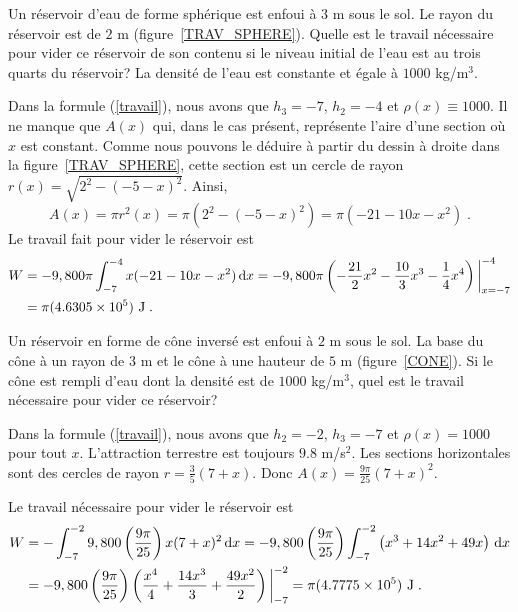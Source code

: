 {

\begin{egg}
Un réservoir d'eau de forme sphérique est enfoui à $3$ m sous le sol.
Le rayon du réservoir est de $2$ m (figure~\ref{TRAV_SPHERE}).  Quelle est le 
travail nécessaire pour vider ce réservoir de son contenu si le niveau
initial de l'eau est au trois quarts du réservoir?  La densité de
l'eau est constante et égale à $1000$ kg/m$^3$.

Dans la formule (\ref{travail}), nous avons que $h_3=-7$, $h_2=-4$ et
$\rho(x) \equiv 1000$.  Il ne manque que $A(x)$ qui, dans le cas présent,
représente l'aire d'une section où $x$ est constant.  Comme nous
pouvons le déduire à partir du dessin à droite dans la
figure~\ref{TRAV_SPHERE}, cette section est un cercle de rayon
$r(x) = \sqrt{2^2 - (-5-x)^2}$.  Ainsi,
\[
A(x) = \pi r^2(x) = \pi (2^2 - (-5-x)^2) = \pi(-21-10x-x^2) \; .
\]
Le travail fait pour vider le réservoir est
\begin{align*}
W &= -9,800\pi \int_{-7}^{-4} x(-21-10x-x^2) \,\mathrm{d}x
= -9,800\pi \left( -\frac{21}{2}x^2 -\frac{10}{3}x^3
  -\frac{1}{4}x^4\right)\bigg|_{x=-7}^{-4}\\
&= \pi( 4.6305 \times 10^5) \ \text{J} \; .
\end{align*}
\end{egg}

\begin{egg}
Un réservoir en forme de cône inversé est enfoui à $2$ m sous le
sol. La base du cône à un rayon de $3$ m et le cône à une hauteur de
$5$ m (figure~\ref{CONE}).  Si le cône est rempli d'eau dont la densité est
de $1000$ kg/m$^3$, quel est le travail nécessaire pour vider ce réservoir?

Dans la formule (\ref{travail}), nous avons que
$h_2=-2$, $h_3=-7$ et $\rho(x) = 1000$ pour tout $x$.  L'attraction
terrestre est toujours $9.8$ m/s$^2$.  Les sections horizontales sont
des cercles de rayon $\displaystyle r= \frac{3}{5} (7+x)$.  Donc
$\displaystyle A(x) = \frac{9\pi}{25} (7+x)^2$.

Le travail nécessaire pour vider le réservoir est
\begin{align*}
W & = - \int_{-7}^{-2} 9,800 \left(\frac{9\pi}{25}\right)x(7+x)^2 \,\mathrm{d}x
= - 9,800\left(\frac{9\pi}{25}\right) \int_{-7}^{-2}
\left( x^3 + 14x^2 + 49x \right) \,\mathrm{d}x \\
&= - 9,800\left(\frac{9\pi}{25}\right) \left(
\frac{x^4}{4} + \frac{14 x^3}{3} + \frac{49 x^2}{2} \right)\bigg|_{-7}^{-2}
= \pi (4.7775 \times 10^5)\ \text{J} \; .
\end{align*}
\end{egg}

}
